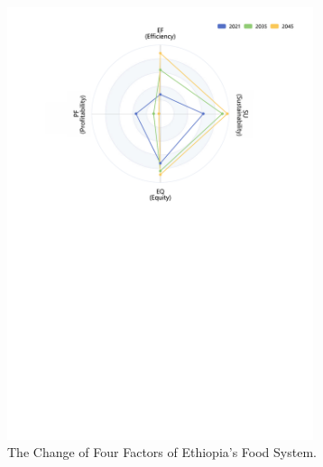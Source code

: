 \documentclass[12pt]{article}
\begin{document}
\begin{figure}[!htb]
\begin{minipage}[t]{0.48\textwidth}
        \includegraphics[width = 0.8\textwidth]{figure/radar/Ethiopia_radar.pdf}
        \caption{The Change of Four Factors of Ethiopia's Food System.\label{fig:Ethiopia_radar}}
    \end{minipage}
\end{figure}
\end{document}
